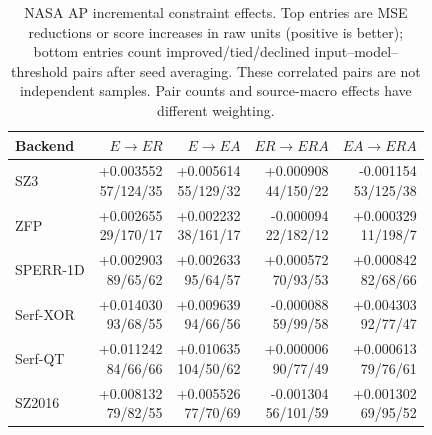 \begin{table}[t]
\centering
\small
\setlength{\tabcolsep}{5pt}
\caption{NASA AP incremental constraint effects. Top entries are MSE reductions or score increases in raw units (positive is better); bottom entries count improved/tied/declined input--model--threshold pairs after seed averaging. These correlated pairs are not independent samples. Pair counts and source-macro effects have different weighting.}
\label{tab:s-ablation-contrast-anomaly-AP}
\begin{tabular}{@{}lrrrr@{}}
\toprule
Backend & $E\to ER$ & $E\to EA$ & $ER\to ERA$ & $EA\to ERA$ \\
\midrule
SZ3 & \shortstack[r]{+0.003552\\57/124/35} & \shortstack[r]{+0.005614\\55/129/32} & \shortstack[r]{+0.000908\\44/150/22} & \shortstack[r]{-0.001154\\53/125/38} \\
ZFP & \shortstack[r]{+0.002655\\29/170/17} & \shortstack[r]{+0.002232\\38/161/17} & \shortstack[r]{-0.000094\\22/182/12} & \shortstack[r]{+0.000329\\11/198/7} \\
SPERR-1D & \shortstack[r]{+0.002903\\89/65/62} & \shortstack[r]{+0.002633\\95/64/57} & \shortstack[r]{+0.000572\\70/93/53} & \shortstack[r]{+0.000842\\82/68/66} \\
Serf-XOR & \shortstack[r]{+0.014030\\93/68/55} & \shortstack[r]{+0.009639\\94/66/56} & \shortstack[r]{-0.000088\\59/99/58} & \shortstack[r]{+0.004303\\92/77/47} \\
Serf-QT & \shortstack[r]{+0.011242\\84/66/66} & \shortstack[r]{+0.010635\\104/50/62} & \shortstack[r]{+0.000006\\90/77/49} & \shortstack[r]{+0.000613\\79/76/61} \\
SZ2016 & \shortstack[r]{+0.008132\\79/82/55} & \shortstack[r]{+0.005526\\77/70/69} & \shortstack[r]{-0.001304\\56/101/59} & \shortstack[r]{+0.001302\\69/95/52} \\
\bottomrule
\end{tabular}
\end{table}

